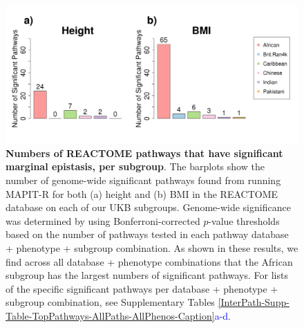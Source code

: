 \documentclass[12pt,a4paper]{article}
\begin{document}
\begin{figure}[htbp]
\centering
\hspace*{-.9cm}
\includegraphics[scale=.45]{Images/Supp/InterPath_Supp_Figure_Barplots_REACTOME_vs4.png}
\caption[TBD]{\textbf{Numbers of REACTOME pathways that have significant marginal epistasis, per subgroup}. The barplots show the number of genome-wide significant pathways found from running MAPIT-R for both (a) height and (b) BMI in the REACTOME database on each of our UKB subgroups. Genome-wide significance was determined by using Bonferroni-corrected $p$-value thresholds based on the number of pathways tested in each pathway database + phenotype + subgroup combination. As shown in these results, we find across all database + phenotype combinations that the African subgroup has the largest numbers of significant pathways. For lists of the specific significant pathways per database + phenotype + subgroup combination, see Supplementary Tables \ref{InterPath-Supp-Table-TopPathways-AllPaths-AllPhenos-Caption}\textcolor{blue}{a-d}.}
\label{InterPath-Supp-Figure-Barplots-REACTOME}
\end{figure}
\clearpage
\end{document}
